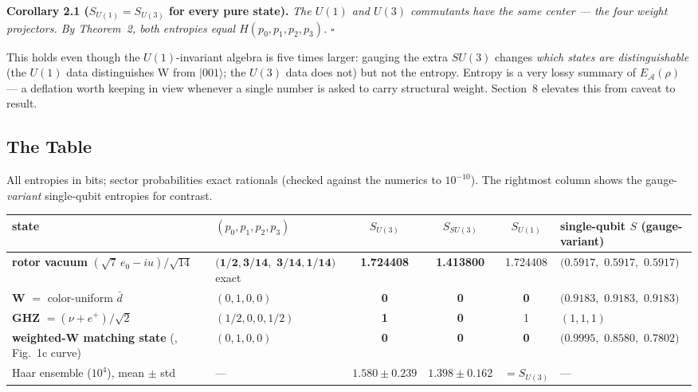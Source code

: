 \documentclass[11pt]{article}
\newcommand{\EA}{E_{\mathcal{A}}}
\begin{document}
\textbf{Corollary 2.1 ($S_{U(1)} = S_{U(3)}$ for every pure state).} \emph{The $U(1)$ and $U(3)$ commutants have the same center --- the four weight projectors. By Theorem~2, both entropies equal $H(p_0, p_1, p_2, p_3)$.} \hfill$\square$

This holds even though the $U(1)$-invariant algebra is five times larger: gauging the extra $SU(3)$ changes \emph{which states are distinguishable} (the $U(1)$ data distinguishes W from $|001\rangle$; the $U(3)$ data does not) but not the entropy. Entropy is a very lossy summary of $\EA(\rho)$ --- a deflation worth keeping in view whenever a single number is asked to carry structural weight. Section~8 elevates this from caveat to result.

\subsection{The Table}

All entropies in bits; sector probabilities exact rationals (checked against the numerics to $10^{-10}$). The rightmost column shows the gauge-\emph{variant} single-qubit entropies for contrast.

\begin{center}
\small
\begin{tabular}{p{2.9cm}p{2.5cm}cccp{2.5cm}}
\hline
state & $(p_0, p_1, p_2, p_3)$ & $S_{U(3)}$ & $S_{SU(3)}$ & $S_{U(1)}$ & single-qubit $S$ (gauge-variant) \\
\hline
\textbf{rotor vacuum} $(\sqrt{7}\,e_0 - iu)/\sqrt{14}$ & $\mathbf{(1/2, 3/14,}$ $\mathbf{3/14, 1/14)}$ exact & \textbf{1.724408} & \textbf{1.413800} & 1.724408 & $(0.5917,$ $0.5917,$ $0.5917)$ \\
\textbf{W} $=$ color-uniform $\bar d$ & $(0, 1, 0, 0)$ & \textbf{0} & \textbf{0} & \textbf{0} & $(0.9183,$ $0.9183,$ $0.9183)$ \\
\textbf{GHZ} $= (\nu + e^+)/\sqrt{2}$ & $(1/2, 0, 0, 1/2)$ & \textbf{1} & \textbf{0} & 1 & $(1, 1, 1)$ \\
\textbf{weighted-W matching state} (\cite{companion}, Fig.~1c curve) & $(0, 1, 0, 0)$ & \textbf{0} & \textbf{0} & \textbf{0} & $(0.9995,$ $0.8580,$ $0.7802)$ \\
Haar ensemble ($10^4$), mean $\pm$ std & --- & $1.580 \pm 0.239$ & $1.398 \pm 0.162$ & $= S_{U(3)}$ & --- \\
\hline
\end{tabular}
\end{center}
\end{document}
